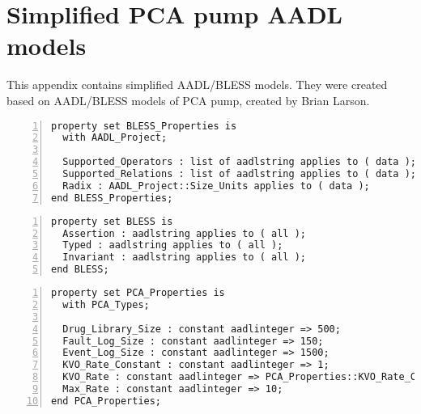 
\cleardoublepage

\chapter{Simplified PCA pump AADL models}
\label{Appendix:AADL}

This appendix contains simplified AADL/BLESS models. They were created based on AADL/BLESS models of PCA pump, created by Brian Larson.
\singlespacing
\begin{lstlisting}[language=aadl, gobble=0, numbers=left, caption={\lstinline{BLESS_Properties} property set}]
property set BLESS_Properties is
  with AADL_Project;

  Supported_Operators : list of aadlstring applies to ( data );
  Supported_Relations : list of aadlstring applies to ( data );
  Radix : AADL_Project::Size_Units applies to ( data );
end BLESS_Properties;
\end{lstlisting} 
\label{listing:aadl:bless_properties}
\doublespacing

\singlespacing
\begin{lstlisting}[language=aadl, gobble=0, numbers=left, caption={\lstinline{BLESS} property set}]
property set BLESS is
  Assertion : aadlstring applies to ( all );
  Typed : aadlstring applies to ( all );
  Invariant : aadlstring applies to ( all );
end BLESS;
\end{lstlisting} 
\label{listing:aadl:bless}
\doublespacing

\singlespacing
\begin{lstlisting}[language=aadl, gobble=0, numbers=left, caption={\lstinline{PCA_Properties} property set}]
property set PCA_Properties is
  with PCA_Types;  
  
  Drug_Library_Size : constant aadlinteger => 500;
  Fault_Log_Size : constant aadlinteger => 150;
  Event_Log_Size : constant aadlinteger => 1500;      
  KVO_Rate_Constant : constant aadlinteger => 1;  
  KVO_Rate : constant aadlinteger => PCA_Properties::KVO_Rate_Constant;
  Max_Rate : constant aadlinteger => 10;     
end PCA_Properties;
\end{lstlisting} 
\label{listing:aadl:pca_properties}
\doublespacing

